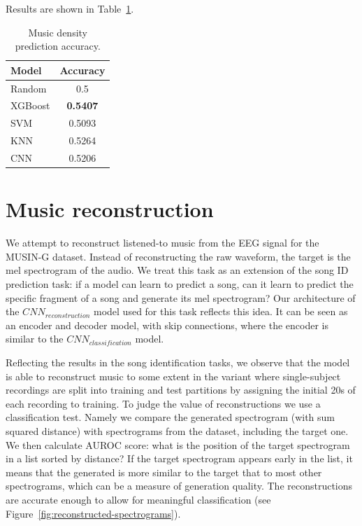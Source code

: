 Results are shown in Table~\ref{tab:density-prediction}.

\begin{table}[h]
  \centering
  \begin{tabular}{|l|c|}
    \hline
    \textbf{Model} & \textbf{Accuracy} \\
    \hline
    Random  & 0.5 \\
    XGBoost & \textbf{0.5407} \\
    SVM     & 0.5093 \\
    KNN     & 0.5264 \\
    CNN     & 0.5206 \\
    \hline
  \end{tabular}
  \caption{Music density prediction accuracy.}
  \label{tab:density-prediction}
\end{table}

\section{Music reconstruction}
\label{sec:music-reconstruction}

We attempt to reconstruct listened-to music from the EEG signal for the MUSIN-G dataset.
Instead of reconstructing the raw waveform, the target is the mel spectrogram of the audio.
We treat this task as an extension of the song ID prediction task: if a model can learn to predict a song, can it learn to predict the specific fragment of a song and generate its mel spectrogram?
Our architecture of the $CNN_{reconstruction}$ model used for this task reflects this idea. 
It can be seen as an encoder and decoder model, with skip connections, where the encoder is similar to the $CNN_{classification}$ model.

Reflecting the results in the song identification tasks, we observe that the model is able to reconstruct music to some extent in the variant where 
single-subject recordings are split into training and test partitions by assigning the initial 20s of each recording to training.
To judge the value of reconstructions we use a classification test.
Namely we compare the generated spectrogram (with sum squared distance) with spectrograms from the dataset, including the target one.
We then calculate AUROC score: what is the position of the target spectrogram in a list sorted by distance?
If the target spectrogram appears early in the list, it means that the generated is more similar to the target that to most other spectrograms, which can be a measure of generation quality.
The reconstructions are accurate enough to allow for meaningful classification (see Figure~\ref{fig:reconstructed-spectrograms}). 

